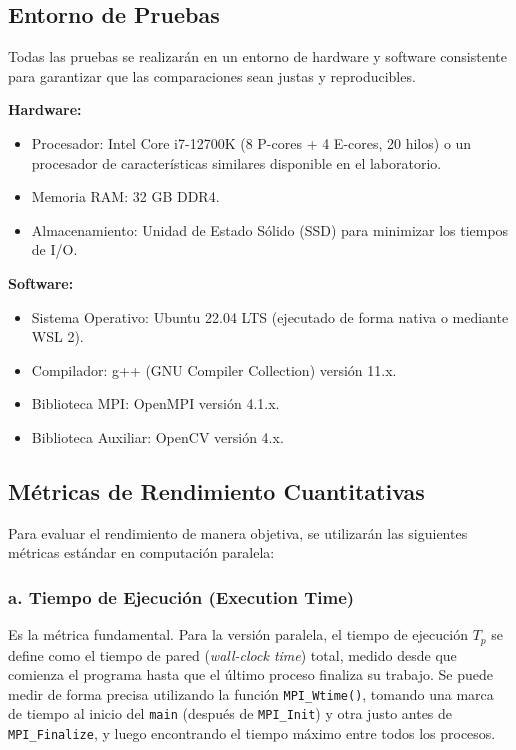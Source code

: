 \documentclass[fleqn,10pt]{article}
\begin{document}
\subsection{Entorno de Pruebas}
Todas las pruebas se realizarán en un entorno de hardware y software consistente para garantizar que las comparaciones sean justas y reproducibles.

\textbf{Hardware:}
\begin{itemize}
    \item Procesador: Intel Core i7-12700K (8 P-cores + 4 E-cores, 20 hilos) o un procesador de características similares disponible en el laboratorio.
    \item Memoria RAM: 32 GB DDR4.
    \item Almacenamiento: Unidad de Estado Sólido (SSD) para minimizar los tiempos de I/O.
\end{itemize}

\textbf{Software:}
\begin{itemize}
    \item Sistema Operativo: Ubuntu 22.04 LTS (ejecutado de forma nativa o mediante WSL 2).
    \item Compilador: g++ (GNU Compiler Collection) versión 11.x.
    \item Biblioteca MPI: OpenMPI versión 4.1.x.
    \item Biblioteca Auxiliar: OpenCV versión 4.x.
\end{itemize}

\subsection{Métricas de Rendimiento Cuantitativas}
Para evaluar el rendimiento de manera objetiva, se utilizarán las siguientes métricas estándar en computación paralela:

\subsubsection*{a. Tiempo de Ejecución (Execution Time)}
Es la métrica fundamental. Para la versión paralela, el tiempo de ejecución $T_p$ se define como el tiempo de pared (\textit{wall-clock time}) total, medido desde que comienza el programa hasta que el último proceso finaliza su trabajo. Se puede medir de forma precisa utilizando la función \texttt{MPI\_Wtime()}, tomando una marca de tiempo al inicio del \texttt{main} (después de \texttt{MPI\_Init}) y otra justo antes de \texttt{MPI\_Finalize}, y luego encontrando el tiempo máximo entre todos los procesos.
\end{document}
